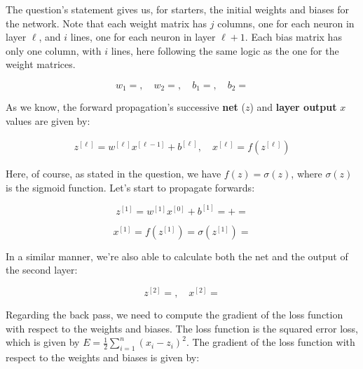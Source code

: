 \documentclass[12pt]{article}
\begin{document}
\begin{enumerate}[leftmargin=\labelsep]
  The question's statement gives us, for starters, the initial weights and biases
  for the network. Note that each weight matrix has $j$ columns, one for each neuron
  in layer $\ell$, and $i$ lines, one for each neuron in layer $\ell + 1$. Each
  bias matrix has only one column, with $i$ lines, here following the same logic
  as the one for the weight matrices.

  \begin{equation*}
    w_1 = , \quad
    w_2 = , \quad
    b_1 = , \quad
    b_2 = 
  \end{equation*}

  As we know, the forward propagation's successive \textbf{net} ($z$) and \textbf{layer output} $x$
  values are given by:

  \begin{equation*}
    \begin{aligned}
      z^{[\ell]} = w^{[\ell]} x^{[\ell-1]} + b^{[\ell]}, \quad
      x^{[\ell]} = f(z^{[\ell]})
    \end{aligned}
  \end{equation*}

  Here, of course, as stated in the question, we have $f(z) = \sigma(z)$, where $\sigma(z)$ is the
  sigmoid function. Let's start to propagate forwards:

  \begin{equation*}
    z^{[1]} = w^{[1]} x^{[0]} + b^{[1]}
    =   + 
    = 
  \end{equation*}

  \begin{equation*}
    x^{[1]} = f(z^{[1]}) = \sigma(z^{[1]}) = 
  \end{equation*}

  In a similar manner, we're also able to calculate both the net and the output
  of the second layer:

  \begin{equation*}
    z^{[2]} = , \quad x^{[2]} = 
  \end{equation*}

  Regarding the back pass, we need to compute the gradient of the loss function with respect to
  the weights and biases. The loss function is the squared error loss, which is given by
  $E = \frac{1}{2} \sum_{i=1}^n (x_i - z_i)^2$.
  The gradient of the loss function with respect to the weights and biases is given by:


\end{enumerate}
\end{document}
